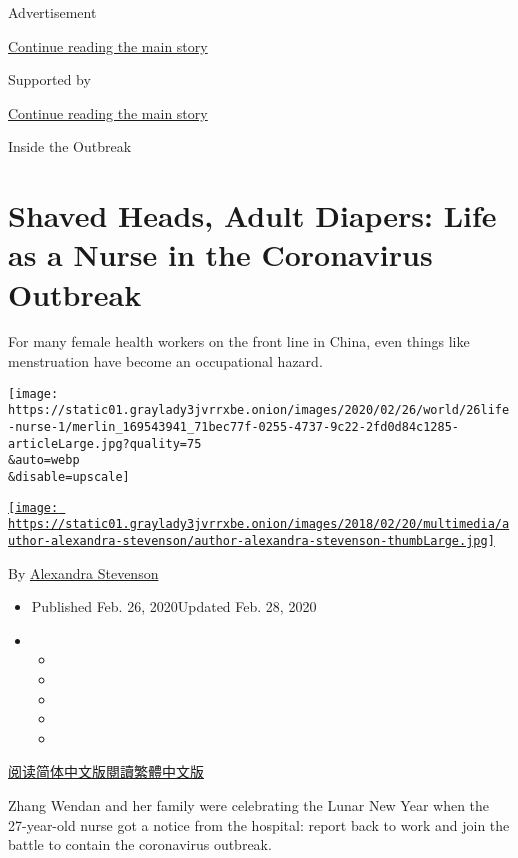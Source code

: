 Advertisement

\protect\hyperlink{after-top}{Continue reading the main story}

Supported by

\protect\hyperlink{after-sponsor}{Continue reading the main story}

Inside the Outbreak

\hypertarget{shaved-heads-adult-diapers-life-as-a-nurse-in-the-coronavirus-outbreak}{%
\section{Shaved Heads, Adult Diapers: Life as a Nurse in the Coronavirus
Outbreak}\label{shaved-heads-adult-diapers-life-as-a-nurse-in-the-coronavirus-outbreak}}

For many female health workers on the front line in China, even things
like menstruation have become an occupational hazard.

\texttt{[image: https://static01.graylady3jvrrxbe.onion/images/2020/02/26/world/26life-nurse-1/merlin\_169543941\_71bec77f-0255-4737-9c22-2fd0d84c1285-articleLarge.jpg?quality=75\\\&auto=webp\\\&disable=upscale]}

\href{https://www.nytimes3xbfgragh.onion/by/alexandra-stevenson}{\texttt{[image: https://static01.graylady3jvrrxbe.onion/images/2018/02/20/multimedia/author-alexandra-stevenson/author-alexandra-stevenson-thumbLarge.jpg]}}

By
\href{https://www.nytimes3xbfgragh.onion/by/alexandra-stevenson}{Alexandra
Stevenson}

\begin{itemize}
\item
  Published Feb. 26, 2020Updated Feb. 28, 2020
\item
  \begin{itemize}
  \item
  \item
  \item
  \item
  \item
  \end{itemize}
\end{itemize}

\href{https://cn.nytimes3xbfgragh.onion/china/20200227/coronavirus-china-nurse-menstruation/}{阅读简体中文版}\href{https://cn.nytimes3xbfgragh.onion/china/20200227/coronavirus-china-nurse-menstruation/zh-hant/}{閱讀繁體中文版}

Zhang Wendan and her family were celebrating the Lunar New Year when the
27-year-old nurse got a notice from the hospital: report back to work
and join the battle to contain the coronavirus outbreak.

